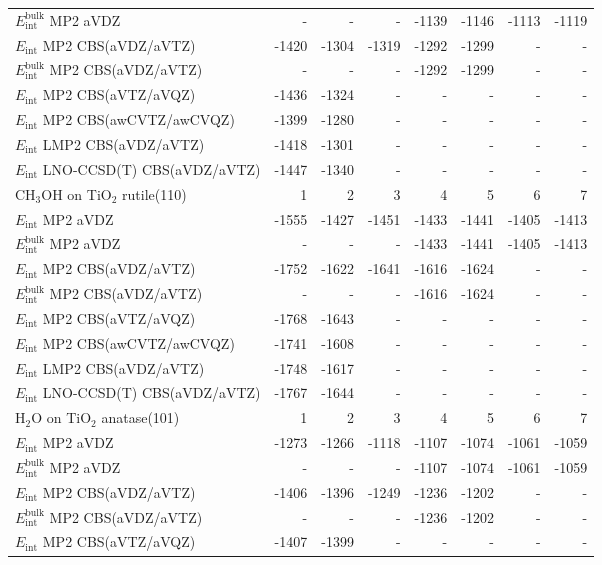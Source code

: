 \begin{longtable}{lrrrrrrr}
$E_\textrm{int}^\textrm{bulk}$ MP2 aVDZ & - & - & - & -1139 & -1146 & -1113 & -1119 \\
$E_\textrm{int}$ MP2 CBS(aVDZ/aVTZ) & -1420 & -1304 & -1319 & -1292 & -1299 & - & - \\
$E_\textrm{int}^\textrm{bulk}$ MP2 CBS(aVDZ/aVTZ) & - & - & - & -1292 & -1299 & - & - \\
$E_\textrm{int}$ MP2 CBS(aVTZ/aVQZ) & -1436 & -1324 & - & - & - & - & - \\
$E_\textrm{int}$ MP2 CBS(awCVTZ/awCVQZ) & -1399 & -1280 & - & - & - & - & - \\
$E_\textrm{int}$ LMP2 CBS(aVDZ/aVTZ) & -1418 & -1301 & - & - & - & - & - \\
$E_\textrm{int}$ LNO-CCSD(T) CBS(aVDZ/aVTZ) & -1447 & -1340 & - & - & - & - & - \\
\toprule
CH$_3$OH on TiO$_2$ rutile(110) & 1 & 2 & 3 & 4 & 5 & 6 & 7 \\ 
\midrule
$E_\textrm{int}$ MP2 aVDZ & -1555 & -1427 & -1451 & -1433 & -1441 & -1405 & -1413 \\
$E_\textrm{int}^\textrm{bulk}$ MP2 aVDZ & - & - & - & -1433 & -1441 & -1405 & -1413 \\
$E_\textrm{int}$ MP2 CBS(aVDZ/aVTZ) & -1752 & -1622 & -1641 & -1616 & -1624 & - & - \\
$E_\textrm{int}^\textrm{bulk}$ MP2 CBS(aVDZ/aVTZ) & - & - & - & -1616 & -1624 & - & - \\
$E_\textrm{int}$ MP2 CBS(aVTZ/aVQZ) & -1768 & -1643 & - & - & - & - & - \\
$E_\textrm{int}$ MP2 CBS(awCVTZ/awCVQZ) & -1741 & -1608 & - & - & - & - & - \\
$E_\textrm{int}$ LMP2 CBS(aVDZ/aVTZ) & -1748 & -1617 & - & - & - & - & - \\
$E_\textrm{int}$ LNO-CCSD(T) CBS(aVDZ/aVTZ) & -1767 & -1644 & - & - & - & - & - \\
\toprule
H$_2$O on TiO$_2$ anatase(101) & 1 & 2 & 3 & 4 & 5 & 6 & 7 \\ 
\midrule
$E_\textrm{int}$ MP2 aVDZ & -1273 & -1266 & -1118 & -1107 & -1074 & -1061 & -1059 \\
$E_\textrm{int}^\textrm{bulk}$ MP2 aVDZ & - & - & - & -1107 & -1074 & -1061 & -1059 \\
$E_\textrm{int}$ MP2 CBS(aVDZ/aVTZ) & -1406 & -1396 & -1249 & -1236 & -1202 & - & - \\
$E_\textrm{int}^\textrm{bulk}$ MP2 CBS(aVDZ/aVTZ) & - & - & - & -1236 & -1202 & - & - \\
$E_\textrm{int}$ MP2 CBS(aVTZ/aVQZ) & -1407 & -1399 & - & - & - & - & - \\

\end{longtable}
